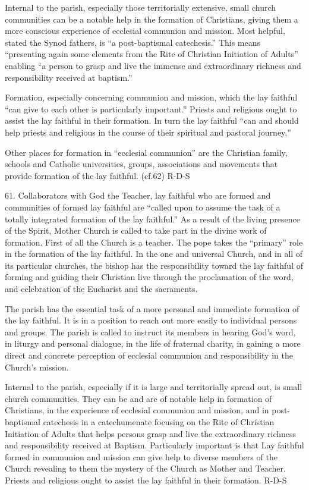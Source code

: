 \documentclass[oneside]{book}
\begin{document}
Internal to the parish, especially those territorially extensive, small church
communities can be a notable help in the formation of Christians, giving them a
more conscious experience of ecclesial communion and mission. Most helpful,
stated the Synod fathers, is ``a post-baptismal catechesis.'' This means
``presenting again some elements from the Rite of Christian Initiation of
Adults'' enabling ``a person to grasp and live the immense and extraordinary
richness and responsibility received at baptism.''

Formation, especially concerning communion and mission, which the lay faithful
``can give to each other is particularly important.''  Priests and religious
ought to assist the lay faithful in their formation. In turn the lay faithful
``can and should help priests and religious in the course of their spiritual and
pastoral journey,''

Other places for formation in ``ecclesial communion'' are the Christian family,
schools and Catholic universities, groups, associations and movements that
provide formation of the lay faithful. (cf.62)
R-D-S


61. Collaborators with God the Teacher, lay faithful who are formed and
communities of formed lay faithful are ``called upon to assume the task of a
totally integrated formation of the lay faithful.''
As a result of the living presence of the Spirit, Mother Church is called to
take part in the divine work of formation.
First of all the Church is a teacher. The pope takes the ``primary'' role in the
formation of the lay faithful. In the one and universal Church, and in all of
its particular churches, the bishop has the responsibility toward the lay
faithful of forming and guiding their Christian live through the proclamation of
the word, and celebration of the Eucharist and the sacraments.

The parish has the essential task of a more personal and immediate formation of
the lay faithful.
It is in a position to reach out more easily to individual persons and
groups. The parish is called to instruct its members in hearing God's word, in
liturgy and personal dialogue, in the life of fraternal charity, in gaining a
more direct and concrete perception of ecclesial communion and responsibility in
the Church's mission.

Internal to the parish, especially if it is large and territorially spread out,
is small church communities. They can be and are of notable help in formation of
Christians, in the experience of ecclesial communion and mission, and in
post-baptismal catechesis in a catechumenate focusing on the Rite of Christian
Initiation of Adults that helps persons grasp and live the extraordinary
richness and responsibility received at Baptism. Particularly important is that
Lay faithful formed in communion and mission can give help to diverse members of
the Church revealing to them the mystery of the Church as Mother and
Teacher. Priests and religious ought to assist the lay faithful in their
formation.
R-D-S
\end{document}
